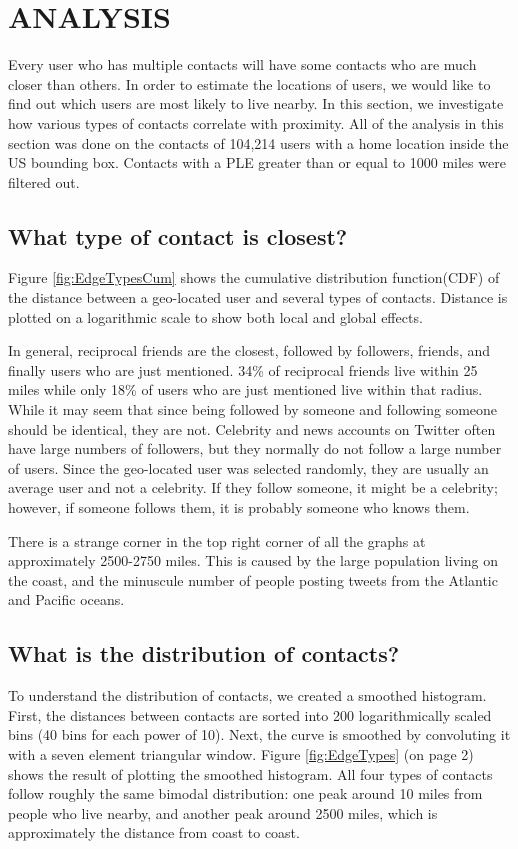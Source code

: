
\chapter{\uppercase{Analysis}}

Every user who has multiple contacts will have some contacts who are much
closer than others. In order to estimate the locations of users, we would like
to find out which users are most likely to live nearby.  In this section, we
investigate how various types of contacts correlate with proximity.
All of the analysis in this section was done on the contacts of 104,214 users
with a home location inside the US bounding box. Contacts with a PLE greater
than or equal to 1000 miles were filtered out.

\section{What type of contact is closest?}

Figure \ref{fig:EdgeTypesCum} shows the cumulative distribution
function(CDF) of the distance between a geo-located user and several types of
contacts.
Distance is plotted on a logarithmic scale to show both local and
global effects.

In general, reciprocal friends are the closest, followed by followers, friends,
and finally users who are just mentioned.
34\% of reciprocal friends live within 25 miles while only 18\% of users who are
just mentioned live within that radius.
While it may seem that since being followed by someone and following someone
should be identical, they are not.
Celebrity and news accounts on Twitter often have large numbers of followers,
but they normally do not follow a large number of users.
Since the geo-located user was selected randomly, they are usually an average
user and not a celebrity.
If they follow someone, it might be a celebrity; however, if someone follows
them, it is probably someone who knows them.

There is a strange corner in the top right corner of all the graphs at
approximately 2500-2750 miles.
This is caused by the large population living on the coast, and the minuscule
number of people posting tweets from the Atlantic and Pacific oceans.

\section{What is the distribution of contacts?}
To understand the distribution of contacts, we created a smoothed histogram.
First, the distances between contacts are sorted into 200 logarithmically
scaled bins (40 bins for each power of 10). Next, the curve is smoothed by
convoluting it with a seven element triangular window.  Figure
\ref{fig:EdgeTypes} (on page 2) shows the result of plotting the smoothed
histogram.  All four types of contacts follow roughly the same bimodal
distribution: one peak around 10 miles from people who live nearby, and another
peak around 2500 miles, which is approximately the distance from coast to
coast.

